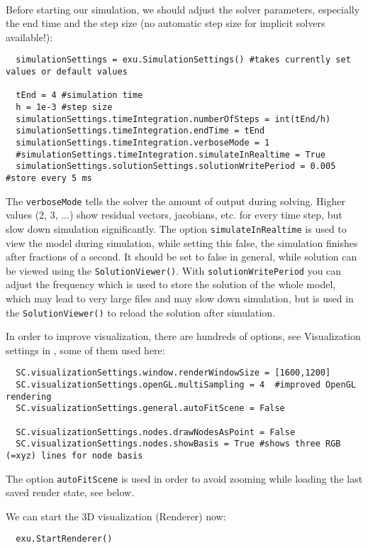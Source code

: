 \horizontalRuler\\
\noindent Before starting our simulation, we should adjust the solver parameters, especially the end time and the step size (no automatic step size for implicit solvers available!):
\pythonstyle\begin{lstlisting}
  simulationSettings = exu.SimulationSettings() #takes currently set values or default values

  tEnd = 4 #simulation time
  h = 1e-3 #step size
  simulationSettings.timeIntegration.numberOfSteps = int(tEnd/h)
  simulationSettings.timeIntegration.endTime = tEnd
  simulationSettings.timeIntegration.verboseMode = 1
  #simulationSettings.timeIntegration.simulateInRealtime = True
  simulationSettings.solutionSettings.solutionWritePeriod = 0.005 #store every 5 ms
\end{lstlisting}
The \texttt{verboseMode} tells the solver the amount of output during solving. Higher values (2, 3, ...) show residual vectors, jacobians, etc. for every time step, but slow down simulation significantly.
The option \texttt{simulateInRealtime} is used to view the model during simulation, while setting this false, 
the simulation finishes after fractions of a second. It should be set to false in general, 
while solution can be viewed using the \texttt{SolutionViewer()}.
With \texttt{solutionWritePeriod} you can adjust the frequency which is used to store the solution of the whole model, 
which may lead to very large files and may slow down simulation, but is used in the \texttt{SolutionViewer()} to reload the solution after simulation.

\noindent In order to improve visualization, there are hundreds of options, see Visualization settings in , some of them used here:
\pythonstyle\begin{lstlisting}
  SC.visualizationSettings.window.renderWindowSize = [1600,1200]
  SC.visualizationSettings.openGL.multiSampling = 4  #improved OpenGL rendering
  SC.visualizationSettings.general.autoFitScene = False

  SC.visualizationSettings.nodes.drawNodesAsPoint = False
  SC.visualizationSettings.nodes.showBasis = True #shows three RGB (=xyz) lines for node basis
\end{lstlisting}
The option \texttt{autoFitScene} is used in order to avoid zooming while loading the last saved render state, see below.

\noindent We can start the 3D visualization (Renderer) now:
\pythonstyle\begin{lstlisting}
  exu.StartRenderer()
\end{lstlisting}

